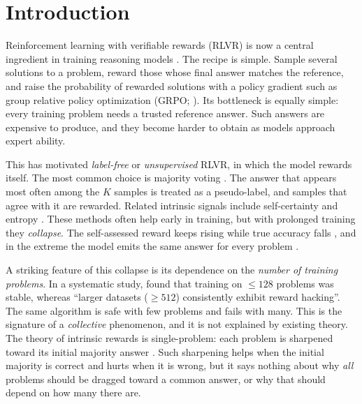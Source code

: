 \section{Introduction}
\label{sec:intro}

Reinforcement learning with verifiable rewards (RLVR) is now a central ingredient in training reasoning models \citep{tulu3,deepseekmath,deepseekr1,qwen3}.
The recipe is simple. Sample several solutions to a problem, reward those whose final answer matches the reference, and raise the probability of rewarded solutions with a policy gradient such as group relative policy optimization (GRPO; \citealp{deepseekmath}).
Its bottleneck is equally simple: every training problem needs a trusted reference answer.
Such answers are expensive to produce, and they become harder to obtain as models approach expert ability.

This has motivated \emph{label-free} or \emph{unsupervised} RLVR, in which the model rewards itself.
The most common choice is majority voting \citep{ttrl,shafayat2025srt}. The answer that appears most often among the $K$ samples is treated as a pseudo-label, and samples that agree with it are rewarded.
Related intrinsic signals include self-certainty and entropy \citep{intuitor,agarwal2025entmin,rent,empo}.
These methods often help early in training, but with prolonged training they \emph{collapse}.
The self-assessed reward keeps rising while true accuracy falls \citep{shafayat2025srt,he2026urlvr}, and in the extreme the model emits the same answer for every problem \citep{shafayat2025srt}.

A striking feature of this collapse is its dependence on the \emph{number of training problems}.
In a systematic study, \citet{he2026urlvr} found that training on $\le128$ problems was stable, whereas ``larger datasets ($\ge512$) consistently exhibit reward hacking''.
The same algorithm is safe with few problems and fails with many.
This is the signature of a \emph{collective} phenomenon, and it is not explained by existing theory.
The theory of intrinsic rewards is single-problem: each problem is sharpened toward its initial majority answer \citep{huang2025sharpening,he2026urlvr}.
Such sharpening helps when the initial majority is correct and hurts when it is wrong, but it says nothing about why \emph{all} problems should be dragged toward a common answer, or why that should depend on how many there are.

